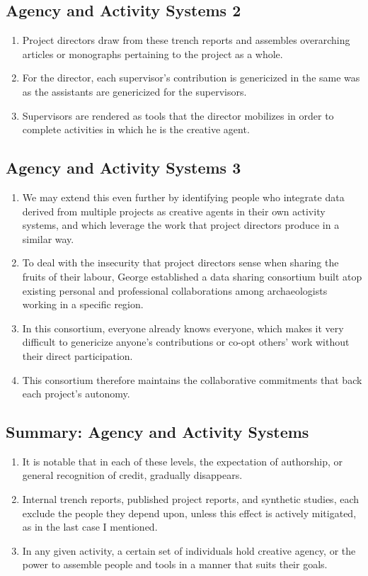 \documentclass{article}
\begin{document}
\subsection{Agency and Activity Systems 2}
\begin{enumerate}
  \item Project directors draw from these trench reports and assembles overarching articles or monographs pertaining to the project as a whole.
  \item For the director, each supervisor's contribution is genericized in the same was as the assistants are genericized for the supervisors.
  \item Supervisors are rendered as tools that the director mobilizes in order to complete activities in which he is the creative agent.
\end{enumerate}

\subsection{Agency and Activity Systems 3}
\begin{enumerate}
  \item We may extend this even further by identifying people who integrate data derived from multiple projects as creative agents in their own activity systems, and which leverage the work that project directors produce in a similar way.
  \item To deal with the insecurity that project directors sense when sharing the fruits of their labour, George established a data sharing consortium built atop existing personal and professional collaborations among archaeologists working in a specific region.
  \item In this consortium, everyone already knows everyone, which makes it very difficult to genericize anyone's contributions or co-opt others' work without their direct participation.
  \item This consortium therefore maintains the collaborative commitments that back each project's autonomy.
\end{enumerate}

\subsection{Summary: Agency and Activity Systems}
\begin{enumerate}
  \item It is notable that in each of these levels, the expectation of authorship, or general recognition of credit, gradually disappears.
  \item Internal trench reports, published project reports, and synthetic studies, each exclude the people they depend upon, unless this effect is actively mitigated, as in the last case I mentioned.
  \item In any given activity, a certain set of individuals hold creative agency, or the power to assemble people and tools in a manner that suits their goals.
\end{enumerate}
\end{document}
